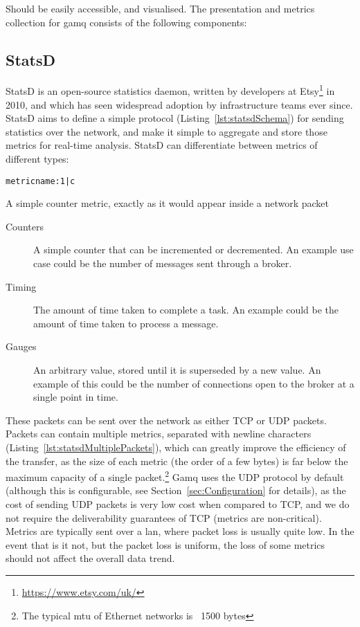 Should be easily accessible, and visualised. The presentation and metrics
collection for gamq consists of the following components:

\subsection{StatsD}
\label{sub:StatsD}

StatsD is an open-source statistics daemon, written by developers at
Etsy\footnote{\url{https://www.etsy.com/uk/}} in 2010\cite{statsd}, and which
has seen widespread adoption by infrastructure teams ever since. StatsD aims to
define a simple protocol (Listing~\ref{lst:statsdSchema}) for sending statistics
over the network, and make it simple to aggregate and store those metrics for
real-time analysis. StatsD can differentiate between metrics of different types:

\begin{listing}
  \centering
  \texttt{metricname:1|c}
  \caption{A simple counter metric, exactly as it would appear inside a network packet}
  \label{lst:statsdSchema}
\end{listing}

\begin{description}
  \item[Counters] A simple counter that can be incremented or decremented. An
  example use case could be the number of messages sent through a broker.
  \item[Timing] The amount of time taken to complete a task. An example could be
  the amount of time taken to process a message.
  \item[Gauges] An arbitrary value, stored until it is superseded by a new
  value. An example of this could be the number of connections open to the
  broker at a single point in time.
\end{description}

These packets can be sent over the network as either TCP or UDP packets. Packets
can contain multiple metrics, separated with newline characters
(Listing~\ref{lst:statsdMultiplePackets}), which can greatly improve the
efficiency of the transfer, as the size of each metric (the order of a few
bytes) is far below the maximum capacity of a single packet.\footnote{The
typical \gls{mtu} of Ethernet networks is ~1500 bytes} Gamq uses the UDP
protocol by default (although this is configurable, see
Section~\ref{sec:Configuration} for details), as the cost of sending UDP packets
is very low cost when compared to TCP, and we do not require the deliverability
guarantees of TCP (metrics are non-critical). Metrics are typically sent over a
\gls{lan}, where packet loss is usually quite low. In the event that is it not,
but the packet loss is uniform, the loss of some metrics should not affect the
overall data trend.

